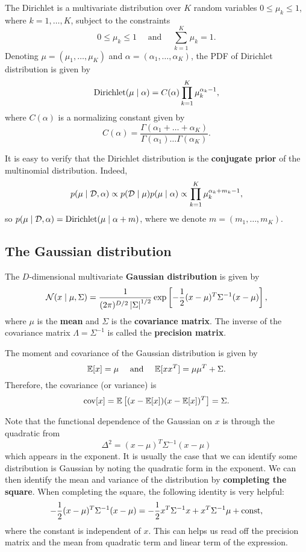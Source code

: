 \documentclass[a4paper]{article}
\begin{document}
\begin{defi}
The Dirichlet is a multivariate distribution over $K$ 
random variables $0 \leq \mu_k \leq 1$,
where $k = 1, \dots, K$, subject to the constraints
\[
0 \leq \mu_k \leq 1 \quad 
\text{ and } \quad \sum_{k=1}^K \mu_k = 1.
\]
Denoting $\mu = (\mu_1, \dots, \mu_K)$ and 
$\alpha = (\alpha_1, \dots, \alpha_K)$,
the PDF of Dirichlet distribution is given by 
\[
\operatorname{Dirichlet}(\mu \mid \alpha)
= C(\alpha) \prod_{k=1}^K \mu_k^{\alpha_k - 1},
\]
where $C(\alpha)$ is a normalizing constant given by 
\[
C(\alpha) = \frac{\Gamma(\alpha_1 + \dots + \alpha_K)}
{\Gamma(\alpha_1) \dots \Gamma(\alpha_K)}.
\]
\end{defi}

It is easy to verify that the Dirichlet distribution
is the \textbf{conjugate prior} of the multinomial distribution. 
Indeed, 
\[
p(\mu \mid \mathcal{D}, \alpha)
\propto p(\mathcal{D} \mid \mu) p(\mu \mid \alpha) 
\propto \prod_{k=1}^K \mu_k^{\alpha_k + m_k - 1},
\]
so $p(\mu \mid \mathcal{D}, \alpha)
= \operatorname{Dirichlet}(\mu \mid \alpha + m)$, where we denote 
$m = (m_1, \dots, m_K)$.

\subsection{The Gaussian distribution}

\begin{defi}
The $D$-dimensional multivariate 
\textbf{Gaussian distribution} is given by 
\[
\mathcal{N} (x \mid \mu, \Sigma) 
= \frac{1}{(2\pi)^{D / 2} \left\lvert \Sigma\right\rvert^{1 / 2}}
\exp \left[ -\frac{1}{2} (x - \mu)^T \Sigma^{-1} (x - \mu) 
\right],
\]
where $\mu$ is the \textbf{mean} and $\Sigma$ is the 
\textbf{covariance matrix}.
The inverse of the covariance matrix $\Lambda = \Sigma^{-1}$ 
is called the \textbf{precision matrix}.
\end{defi}

The moment and covariance of the Gaussian distribution
is given by 
\[
\mathbb{E}[x] = \mu \quad \text{ and } \quad 
\mathbb{E}[x x^T] = \mu \mu^T + \Sigma.
\]
Therefore, the covariance (or variance) is 
\[
\operatorname{cov}[x] = \mathbb{E} \left[ (x - \mathbb{E}[x]) (x - \mathbb{E}[x])^T \right]
= \Sigma.
\]

Note that the functional dependence of the Gaussian on 
$x$ is through the quadratic from
\[
\Delta^2 = (x - \mu)^T \Sigma^{-1} (x - \mu)
\]
which appears in the exponent. It is usually the case 
that we can identify some distribution is Gaussian by 
noting the quadratic form in the exponent. We can then 
identify the mean and variance of the distribution by 
\textbf{completing the square}. When completing the square,
the following identity is very helpful:
\[
- \frac{1}{2} (x - \mu)^T \Sigma^{-1} (x - \mu) 
= - \frac{1}{2} x^T \Sigma^{-1} x 
+ x^T \Sigma^{-1} \mu + \mathrm{const},
\]
where the constant is independent of $x$. This can helps 
us read off the precision matrix and the mean from quadratic
term and linear term of the expression.
\end{document}
